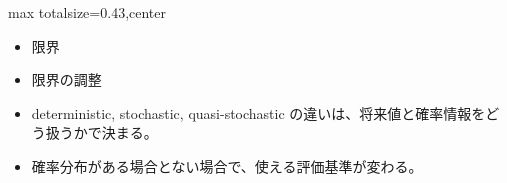 \clearpage
{}
\begin{minipage}[t]{0.405\textwidth}
\begin{adjustbox}{max totalsize={\textwidth}{0.43\textheight},center}
\begin{minipage}{\textwidth}\scriptsize
{}\begin{itemize}
\item 限界
\item 限界の調整
\end{itemize}\begin{itemize}
\item deterministic, stochastic, quasi-stochastic の違いは、将来値と確率情報をどう扱うかで決まる。
\item 確率分布がある場合とない場合で、使える評価基準が変わる。
\end{itemize}
\end{minipage}
\end{adjustbox}
\end{minipage}\hfill
